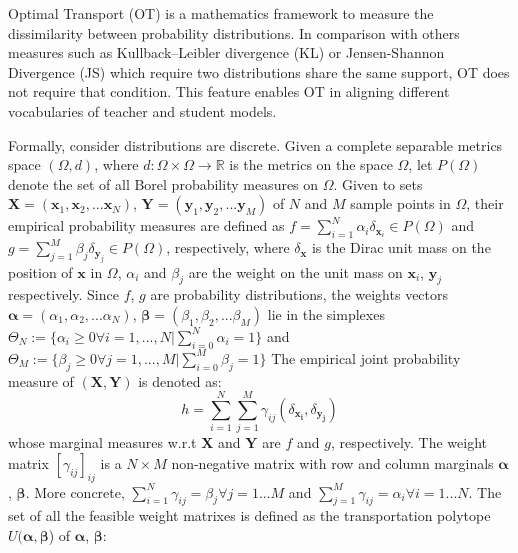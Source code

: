 
Optimal Transport (OT) \citep{villani2009optimal} is a mathematics framework to measure the dissimilarity between probability distributions. In comparison with others measures such as Kullback–Leibler divergence (KL) or Jensen-Shannon Divergence (JS) which require two distributions share the same support, OT does not require that condition. This feature enables OT in aligning different vocabularies of teacher and student models.

Formally, consider distributions are discrete. Given a complete separable metrics space $(\Omega,d)$, where $d:\Omega \times \Omega \to \mathbb{R}$ is the metrics on the space $\Omega$, let $P(\Omega)$ denote the set of all Borel probability measures on $\Omega$. Given to sets $\boldsymbol{X} = (\boldsymbol{x}_{1}, \boldsymbol{x}_{2}, ...\boldsymbol{x}_{N})$, $\boldsymbol{Y} = (\boldsymbol{y}_{1}, \boldsymbol{y}_{2}, ...\boldsymbol{y}_{M})$ of $N$ and $M$ sample points in $\Omega$, their empirical probability measures are defined as $f = \sum_{i=1}^{N} \alpha_{i} \delta_{\boldsymbol{x}_{i}} \in P(\Omega)$ 
and  $g = \sum_{j=1}^{M} \beta_{j} \delta_{\boldsymbol{y}_{j}} \in P(\Omega)$, respectively, where $\delta_{\boldsymbol{x}}$ is the Dirac unit mass on the position of $\boldsymbol{x}$ in $\Omega$, $\alpha_{i}$ and $\beta_{j}$ are the weight on the unit mass on $\boldsymbol{x}_i$, $\boldsymbol{y}_j$ respectively. Since $f$, $g$ are probability distributions, the weights vectors $\boldsymbol{\alpha} = (\alpha_1, \alpha_2, ... \alpha_N)$, $\boldsymbol{\beta} = (\beta_1, \beta_2, ... \beta_M)$ lie in the simplexes  $ \Theta_{N} := \{ \alpha_i \geq 0 \forall i = 1,...,N | \sum_{i=0}^{N} \alpha_i = 1 \}$ and $ \Theta_{M} := \{ \beta_j \geq 0 \forall j = 1,...,M | \sum_{i=0}^{M} \beta_j = 1 \}$
The empirical joint probability measure of $(\boldsymbol{X},\boldsymbol{Y})$ is denoted as: 
\begin{equation}
    h = \sum_{i=1}^{N} \sum_{j=1}^{M} \gamma_{ij}(\delta_{\boldsymbol{x_i}}, \delta_{\boldsymbol{y_j}})
\end{equation} whose marginal measures w.r.t $\boldsymbol{X}$ and $\boldsymbol{Y}$ are $f$ and $g$, respectively. The weight matrix $[\gamma_{ij}]_{ij}$ is a $N \times M$ non-negative matrix with row and column marginals $\boldsymbol{\alpha}$, $\boldsymbol{\beta}$. More concrete, $\sum_{i=1}^{N} \gamma_{ij} = \beta_{j} \forall j=1...M$ and $\sum_{j=1}^{M} \gamma_{ij} = \alpha_{i} \forall i=1...N$. The set of all the feasible weight matrixes is defined as the transportation polytope $U(\boldsymbol{\alpha}, \boldsymbol{\beta}$) of $\boldsymbol{\alpha}$, $\boldsymbol{\beta}$:
